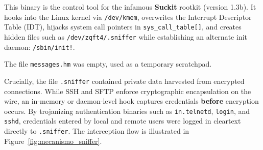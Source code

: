 This binary is the control tool for the infamous \textbf{Suckit} rootkit (version 1.3b). It hooks into the Linux kernel via \texttt{/dev/kmem}, overwrites the Interrupt Descriptor Table (IDT), hijacks system call pointers in \texttt{sys\_call\_table[]}, and creates hidden files such as \texttt{/dev/zqft4/.sniffer} while establishing an alternate init daemon: \texttt{/sbin/init!}.

The file \texttt{messages.hm} was empty, used as a temporary scratchpad.

Crucially, the file \texttt{.sniffer} contained private data harvested from encrypted connections. While SSH and SFTP enforce cryptographic encapsulation on the wire, an in-memory or daemon-level hook captures credentials \textbf{before} encryption occurs. By trojanizing authentication binaries such as \texttt{in.telnetd}, \texttt{login}, and \texttt{sshd}, credentials entered by local and remote users were logged in cleartext directly to \texttt{.sniffer}. The interception flow is illustrated in Figure~\ref{fig:mecanismo_sniffer}.

